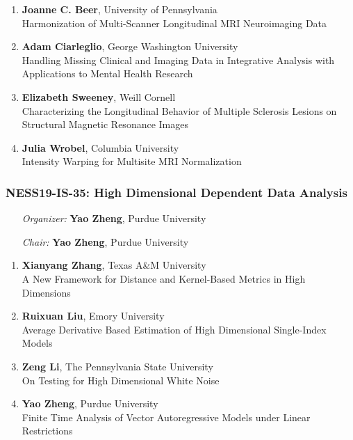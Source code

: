 \begin{enumerate}
\item \textbf{Joanne C. Beer}, University of Pennsylvania \\
Harmonization of Multi-Scanner Longitudinal MRI Neuroimaging Data
\item \textbf{Adam Ciarleglio}, George Washington University \\
Handling Missing Clinical and Imaging Data in Integrative Analysis with Applications to Mental Health Research
\item \textbf{Elizabeth Sweeney}, Weill Cornell \\
Characterizing the Longitudinal Behavior of Multiple Sclerosis Lesions on Structural Magnetic Resonance Images
\item \textbf{Julia Wrobel}, Columbia University \\
Intensity Warping for Multisite MRI Normalization
\end{enumerate}

\subsubsection*{NESS19-IS-35: High Dimensional Dependent Data Analysis}

\begin{enumerate}[align=left]
\item [\emph{Organizer:}] \textbf{Yao Zheng}, Purdue University \\
\item [\emph{Chair:}] \textbf{Yao Zheng}, Purdue University
\end{enumerate}

\begin{enumerate}
\item \textbf{Xianyang Zhang}, Texas A\&M University \\
A New Framework for Distance and Kernel-Based Metrics in High Dimensions
\item \textbf{Ruixuan Liu}, Emory University \\
Average Derivative Based Estimation of High Dimensional Single-Index Models
\item \textbf{Zeng Li}, The Pennsylvania State University \\
On Testing for High Dimensional White Noise
\item \textbf{Yao Zheng}, Purdue University \\
Finite Time Analysis of Vector Autoregressive Models under Linear Restrictions
\end{enumerate}

